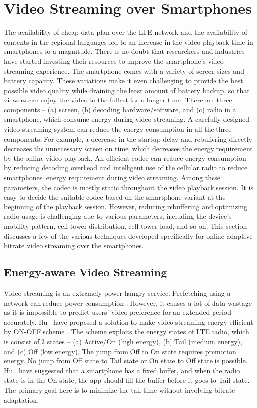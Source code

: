 \section{Video Streaming over Smartphones}
The availability of cheap data plan over the \ac{LTE} network and the availability of contents in the regional languages led to an increase in the video playback time in smartphones to a magnitude. There is no doubt that researchers and industries have started investing their resources to improve the smartphone's video streaming experience. The smartphone comes with a variety of screen sizes and battery capacity. These variations make it even challenging to provide the best possible video quality while draining the least amount of battery backup, so that viewers can enjoy the video to the fullest for a longer time. There are three components -- (a) screen, (b) decoding hardware/software, and (c) radio in a smartphone, which consume energy during video streaming. A carefully designed video streaming system can reduce the energy consumption in all the three components. For example, a decrease in the startup delay and rebuffering directly decreases the unnecessary screen on time, which decreases the energy requirement by the online video playback. An efficient codec can reduce energy consumption by reducing decoding overhead and intelligent use of the cellular radio to reduce smartphones' energy requirement during video streaming. Among these parameters, the codec is mostly static throughout the video playback session. It is easy to decide the suitable codec based on the smartphone variant at the beginning of the playback session. However, reducing rebuffering and optimizing radio usage is challenging due to various parameters, including the device's mobility pattern, cell-tower distribution, cell-tower load, and so on. This section discusses a few of the various techniques developed specifically for online adaptive bitrate video streaming over the smartphones.

\subsection{Energy-aware Video Streaming}
Video streaming is an extremely power-hungry service. Prefetching using a  network can reduce power consumption \cite{6681586,10.1145/2079296.2079321}. However, it causes a lot of data wastage as it is impossible to predict users' video preference for an extended period accurately. Hu \etal\ have proposed a solution to make video streaming energy efficient by ON-OFF scheme \cite{7218493}. The scheme exploits the energy states of \ac{LTE} radio, which is consist of 3 states -- (a) Active/On (high energy), (b) Tail (medium energy), and (c) Off (low energy). The jump from Off to On state requires promotion energy. No jump from Off state to Tail state or On state to Off state is possible. Hu \etal\ have suggested that a smartphone has a fixed buffer, and when the radio state is in the On state, the app should fill the buffer before it goes to Tail state. The primary goal here is to minimize the tail time without involving bitrate adaptation.

